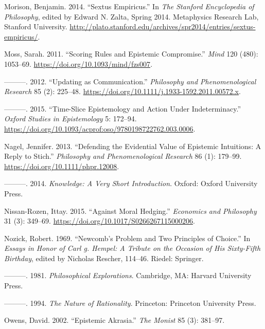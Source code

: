 \documentclass[
  10pt,
  letterpaper,
  twoside]{scrbook}
\newlength{\cslhangindent}
\newenvironment{CSLReferences}[2] %
 {\begin{list}{}{%
  \setlength{\itemindent}{0pt}
  \setlength{\leftmargin}{0pt}
  \setlength{\parsep}{0pt}
  \ifodd #1
   \setlength{\leftmargin}{\cslhangindent}
   \setlength{\itemindent}{-1\cslhangindent}
  \fi
  \setlength{\itemsep}{#2\baselineskip}}}
 {\end{list}}
\begin{document}
\begin{CSLReferences}{1}{0}
Morison, Benjamin. 2014. {``Sextus Empiricus.''} In \emph{The Stanford
Encyclopedia of Philosophy}, edited by Edward N. Zalta, Spring 2014.
Metaphysics Research Lab, Stanford University.
\url{http://plato.stanford.edu/archives/spr2014/entries/sextus-empiricus/}.

Moss, Sarah. 2011. {``Scoring Rules and Epistemic Compromise.''}
\emph{Mind} 120 (480): 1053--69.
\url{https://doi.org/10.1093/mind/fzs007}.

---------. 2012. {``Updating as Communication.''} \emph{Philosophy and
Phenomenological Research} 85 (2): 225--48.
\url{https://doi.org/10.1111/j.1933-1592.2011.00572.x}.

---------. 2015. {``Time-Slice Epistemology and Action Under
Indeterminacy.''} \emph{Oxford Studies in Epistemology} 5: 172--94.
\url{https://doi.org/10.1093/acprof:oso/9780198722762.003.0006}.

Nagel, Jennifer. 2013. {``Defending the Evidential Value of Epistemic
Intuitions: A Reply to Stich.''} \emph{{P}hilosophy and
{P}henomenological {R}esearch} 86 (1): 179--99.
\url{https://doi.org/10.1111/phpr.12008}.

---------. 2014. \emph{Knowledge: A Very Short Introduction}. Oxford:
Oxford University Press.

Nissan-Rozen, Ittay. 2015. {``Against Moral Hedging.''} \emph{Economics
and Philosophy} 31 (3): 349--69.
\url{https://doi.org/10.1017/S0266267115000206}.

Nozick, Robert. 1969. {``Newcomb's Problem and Two Principles of
Choice.''} In \emph{Essays in Honor of Carl g. Hempel: A Tribute on the
Occasion of His Sixty-Fifth Birthday}, edited by Nicholas Rescher,
114--46. Riedel: Springer.

---------. 1981. \emph{Philosophical Explorations}. Cambridge, MA:
Harvard University Press.

---------. 1994. \emph{The Nature of Rationality}. Princeton: Princeton
University Press.

Owens, David. 2002. {``Epistemic Akrasia.''} \emph{The Monist} 85 (3):
381--97.


\end{CSLReferences}
\end{document}
